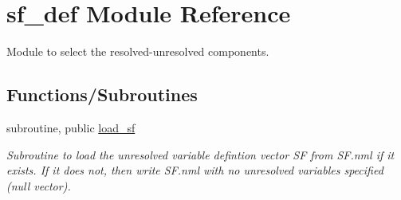 \hypertarget{namespacesf__def}{}\section{sf\+\_\+def Module Reference}
\label{namespacesf__def}


Module to select the resolved-\/unresolved components.  


\subsection*{Functions/\+Subroutines}
\begin{DoxyCompactItemize}
\item 
subroutine, public \hyperlink{namespacesf__def_aefac3d4682ec35c401bb888b10dc4f47}{load\+\_\+sf}
\begin{DoxyCompactList}\small\item\em Subroutine to load the unresolved variable defintion vector {\ttfamily SF} from S\+F.\+nml if it exists. If it does not, then write S\+F.\+nml with no unresolved variables specified (null vector). \end{DoxyCompactList}\end{DoxyCompactItemize}
